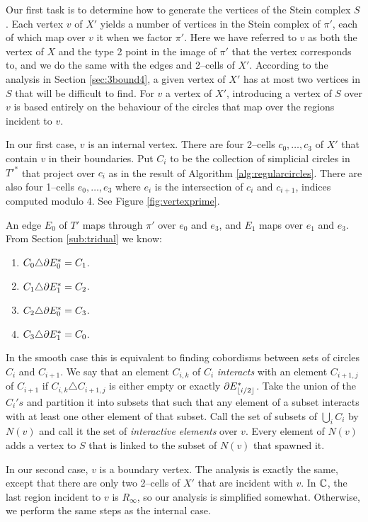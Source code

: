 Our first task is to determine how to generate the vertices of the Stein complex $S$.
Each vertex $v$ of $X'$ yields a number of vertices in the Stein complex of $\pi'$, each of which map over $v$ it when we factor $\pi'$.
Here we have referred to $v$ as both the vertex of $X$ and the type 2 point in the image of $\pi'$ that the vertex corresponds to, and we do the same with the edges and 2--cells of $X'$.
According to the analysis in Section \ref{sec:3bound4}, a given vertex of $X'$ has at most two vertices in $S$ that will be difficult to find.
For $v$ a vertex of $X'$, introducing a vertex of $S$ over $v$ is based entirely on the behaviour of the circles that map over the regions incident to $v$.

In our first case, $v$ is an internal vertex.
There are four 2--cells $c_0,\dots,c_3$ of $X'$ that contain $v$ in their boundaries.
Put $C_i$ to be the collection of simplicial circles in $T'^*$ that project over $c_i$ as in the result of Algorithm \ref{alg:regularcircles}.
There are also four 1--cells $e_0,\dots,e_3$ where $e_i$ is the intersection of $c_i$ and $c_{i+1}$, indices computed modulo 4.
See Figure \ref{fig:vertexprime}.

An edge $E_0$ of $T'$ maps through $\pi'$ over $e_0$ and $e_3$, and $E_1$ maps over $e_1$ and $e_3$.
From Section \ref{sub:tridual} we know:
\begin{enumerate}
	\item $C_0\triangle \partial E_0^* = C_1$.
	\item $C_1\triangle \partial E_1^* = C_2$.
	\item $C_2\triangle \partial E_0^* = C_3$.
	\item $C_3\triangle \partial E_1^* = C_0$.
\end{enumerate} 
In the smooth case this is equivalent to finding cobordisms between sets of circles $C_i$ and $C_{i+1}$.
We say that an element $C_{i,k}$ of $C_i$ \emph{interacts} with an element $C_{i+1,j}$ of $C_{i+1}$ if $C_{i,k}\triangle C_{i+1,j}$ is either empty or exactly $\partial E_{\lfloor i/2\rfloor}^*$.
Take the union of the $C_i's$ and partition it into subsets that such that any element of a subset interacts with at least one other element of that subset.
Call the set of subsets of $\bigcup_i C_i$ by $N(v)$ and call it the set of \emph{interactive elements} over $v$.
Every element of $N(v)$ adds a vertex to $S$ that is linked to the subset of $N(v)$ that spawned it.

In our second case, $v$ is a boundary vertex.
The analysis is exactly the same, except that there are only two 2--cells of $X'$ that are incident with $v$.
In $\mathbb{C}$, the last region incident to $v$ is $R_\infty$, so our analysis is simplified somewhat.
Otherwise, we perform the same steps as the internal case.


